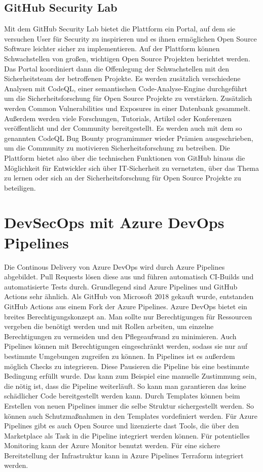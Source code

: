 \section{GitHub Security Lab}
Mit dem GitHub Security Lab bietet die Plattform ein Portal, auf dem sie versuchen User für Security zu inspirieren und es ihnen ermöglichen Open Source Software leichter sicher zu implementieren. 
Auf der Plattform können Schwachstellen von großen, wichtigen Open Source Projekten berichtet werden. Das Portal koordiniert dann die Offenlegung der Schwachstellen mit den Sicherheitsteam der betroffenen Projekte. Es werden zusätzlich verschiedene Analysen mit CodeQL, einer semantischen Code-Analyse-Engine durchgeführt um die Sicherheitsforschung für Open Source Projekte zu verstärken. Zusätzlich werden Common Vulnerabilities und Exposures in einer Datenbank gesammelt.
Außerdem werden viele Forschungen, Tutorials, Artikel oder Konferenzen veröffentlicht und der Community bereitgestellt.
Es werden auch mit dem so genannten \glqq CodeQL Bug Bounty program\grqq\enspace immer wieder Prämien ausgeschrieben, um die Community zu motivieren Sicherheitsforschung zu betreiben. Die Plattform bietet also über die technischen Funktionen von GitHub hinaus die Möglichkeit für Entwickler sich über IT-Sicherheit zu vernetzten, über das Thema zu lernen oder sich an der Sicherheitsforschung für Open Source Projekte zu beteiligen. \cite{github-securitylab}

\chapter{DevSecOps mit Azure DevOps Pipelines}

Die Continous Delivery von Azure DevOps wird durch Azure Pipelines abgebildet. Pull Requests lösen diese aus und führen automatisch CI-Builds und automatisierte Tests durch. Grundlegend sind Azure Pipelines und GitHub Actions sehr ähnlich. Als GitHub von Microsoft 2018 gekauft wurde, entstanden GitHub Actions aus einem Fork der Azure Pipelines. \cite{mic-actions-pipelines} 
Azure DevOps bietet ein breites Berechtigungskonzept an. Man sollte nur Berechtigungen für Ressourcen vergeben die benötigt werden und mit Rollen arbeiten, um einzelne Berechtigungen zu vermeiden und den Pflegeaufwand zu minimieren. Auch Pipelines können mit Berechtigungen eingeschränkt werden, sodass sie nur auf bestimmte Umgebungen zugreifen zu können.
In Pipelines ist es außerdem möglich Checks zu integrieren. Diese Pausieren die Pipeline bis eine bestimmte Bedingung erfüllt wurde. Das kann zum Beispiel eine manuelle Zustimmung sein, die nötig ist, dass die Pipeline weiterläuft. So kann man garantieren das keine schädlicher Code bereitgestellt werden kann. \cite{mic-ressouce-protection} Durch Templates können beim Erstellen von neuen Pipelines immer die selbe Struktur sichergestellt werden. So können auch Schutzmaßnahmen in den Templates vordefiniert werden. \cite{mic-templates}
Für Azure Pipelines gibt es auch Open Source und lizenzierte \ac{dast} Tools, die über den Marketplace als Task in die Pipeline integriert werden können. Für potentielles Monitoring kann der Azure Monitor benutzt werden.
Für eine sichere Bereitstellung der Infrastruktur kann in Azure Pipelines Terraform integriert werden. \cite{EdPrice-MSFT_undated-bx}

